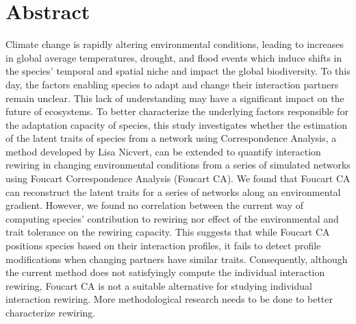 \section{Abstract}

Climate change is rapidly altering environmental conditions, leading to increases in global average temperatures, drought, and flood events which induce shifts in the species' temporal and spatial niche and impact the global biodiversity. 
To this day, the factors enabling species to adapt and change their interaction partners remain unclear. This lack of understanding may have a significant impact on the future of ecosystems. To better characterize the underlying factors responsible for the adaptation capacity of species, this study investigates whether the estimation of the latent traits of species from a network using Correspondence Analysis, a method developed by Lisa Nicvert, can be extended to quantify interaction rewiring in changing environmental conditions from a series of simulated networks using Foucart Correspondence Analysis (Foucart CA).
We found that Foucart CA can reconstruct the latent traits for a series of networks along an environmental gradient. However, we found no correlation between the current way of computing species' contribution to rewiring nor effect of the environmental and trait tolerance on the rewiring capacity. This suggests that while Foucart CA positions species based on their interaction profiles, it fails to detect profile modifications when changing partners have similar traits. Consequently, although the current method does not satisfyingly compute the individual interaction rewiring, Foucart CA is not a suitable alternative for studying individual interaction rewiring. More methodological research needs to be done to better characterize rewiring.